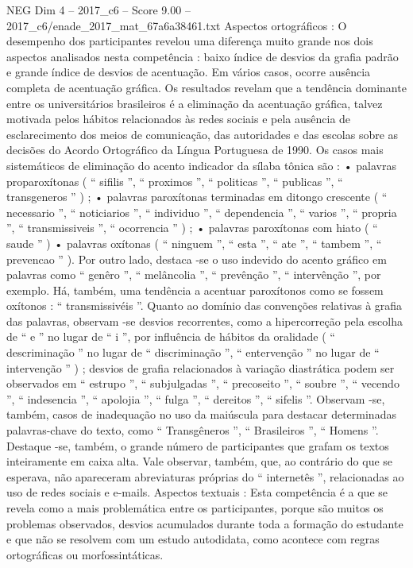 \begin{textsample}{NEG Dim 4 – 2017\_c6 – Score 9.00 – 2017\_c6/enade\_2017\_mat\_67a6a38461.txt}
Aspectos ortográficos : O desempenho dos participantes revelou uma diferença muito grande nos dois aspectos analisados nesta competência : baixo índice de desvios da grafia padrão e grande índice de desvios de acentuação.
Em vários casos, ocorre ausência completa de acentuação gráfica.
Os resultados revelam que a tendência dominante entre os universitários brasileiros é a eliminação da acentuação gráfica, talvez motivada pelos hábitos relacionados às redes sociais e pela ausência de esclarecimento dos meios de comunicação, das autoridades e das escolas sobre as decisões do Acordo Ortográfico da Língua Portuguesa de 1990.
Os casos mais sistemáticos de eliminação do acento indicador da sílaba tônica são : • palavras proparoxítonas ( “ sifilis ”, “ proximos ”, “ politicas ”, “ publicas ”, “ transgeneros ” ) ; • palavras paroxítonas terminadas em ditongo crescente ( “ necessario ”, “ noticiarios ”, “ individuo ”, “ dependencia ”, “ varios ”, “ propria ”, “ transmissiveis ”, “ ocorrencia ” ) ; • palavras paroxítonas com hiato ( “ saude ” ) • palavras oxítonas ( “ ninguem ”, “ esta ”, “ ate ”, “ tambem ”, “ prevencao ” ).
Por outro lado, destaca -se o uso indevido do acento gráfico em palavras como “ genêro ”, “ melâncolia ”, “ prevênção ”, “ intervênção ”, por exemplo.
Há, também, uma tendência a acentuar paroxítonos como se fossem oxítonos : “ transmissivéis ”.
Quanto ao domínio das convenções relativas à grafia das palavras, observam -se desvios recorrentes, como a hipercorreção pela escolha de “ e ” no lugar de “ i ”, por influência de hábitos da oralidade ( “ descriminação ” no lugar de “ discriminação ”, “ entervenção ” no lugar de “ intervenção ” ) ; desvios de grafia relacionados à variação diastrática podem ser observados em “ estrupo ”, “ subjulgadas ”, “ precoseito ”, “ soubre ”, “ vecendo ”, “ indesencia ”, “ apolojia ”, “ fulga ”, “ dereitos ”, “ sifelis ”.
Observam -se, também, casos de inadequação no uso da maiúscula para destacar determinadas palavras-chave do texto, como “ Transgêneros ”, “ Brasileiros ”, “ Homens ”.
Destaque -se, também, o grande número de participantes que grafam os textos inteiramente em caixa alta.
Vale observar, também, que, ao contrário do que se esperava, não apareceram abreviaturas próprias do “ internetês ”, relacionadas ao uso de redes sociais e e-mails.
Aspectos textuais : Esta competência é a que se revela como a mais problemática entre os participantes, porque são muitos os problemas observados, desvios acumulados durante toda a formação do estudante e que não se resolvem com um estudo autodidata, como acontece com regras ortográficas ou morfossintáticas.

\end{textsample}
